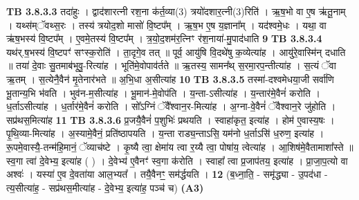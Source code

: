 \documentclass[17pt]{extarticle}
\begin{document}
{{{{{{{{{{{{{{{{{{{{{{                  \newline
                                \textbf{ TB 3.8.3.3} \newline
                  तदा॑हुः । द्वाद॑शारत्नी रश॒ना क॑र्त॒व्या(3) त्रयो॑दशार॒त्नी(3)रिति॑ । ऋ॒ष॒भो वा ए॒ष ऋ॑तू॒नाम् । यथ्स॑म्ॅवथ्स॒रः । तस्य॑ त्रयोद॒शो मासो॑ वि॒ष्टप᳚म् । ऋ॒ष॒भ ए॒ष य॒ज्ञाना᳚म् । यद॑श्वमे॒धः । यथा॒ वा ऋ॑ष॒भस्य॑ वि॒ष्टप᳚म् । ए॒वमे॒तस्य॑ वि॒ष्टप᳚म् । त्र॒यो॒द॒शम॑र॒त्निꣳ र॑श॒नाया॑-मु॒पाद॑धाति \textbf{ 9} \newline
                  \newline
                                \textbf{ TB 3.8.3.4} \newline
                  यथ॑र्.ष॒भस्य॑ वि॒ष्टपꣳ॑ सꣳस्क॒रोति॑ । ता॒दृगे॒व तत् ॥ पूर्व॒ आयु॑षि वि॒दथे॑षु क॒व्येत्या॑ह । आयु॑रे॒वास्मि॑न् दधाति ॥ तया॑ दे॒वाः सु॒तमाब॑भूवु॒-रित्या॑ह । भूति॑मे॒वोपाव॑र्तते ॥ ऋ॒तस्य॒ सामन᳚थ् स॒रमा॒रप॒न्तीत्या॑ह । स॒त्यं ॅवा ऋ॒तम् । स॒त्येनै॒वैन॑ मृ॒तेनार॑भते ॥ अ॒भि॒धा अ॒सीत्या॑ह \textbf{ 10} \newline
                  \newline
                                \textbf{ TB 3.8.3.5} \newline
                  तस्मा॑-दश्वमेधया॒जी सर्वा॑णि भू॒तान्य॒भि भ॑वति । भुव॑न-म॒सीत्या॑ह । भू॒मान॑-मे॒वोप॑ति । य॒न्ता-ऽसीत्या॑ह । य॒न्तार॑मे॒वैनं॑ करोति । ध॒र्ताऽसीत्या॑ह । ध॒र्तार॑मे॒वैनं॑ करोति । सो᳚ऽग्निं ॅवै᳚श्वान॒र-मित्या॑ह । अ॒ग्ना-वे॒वैनं॑ ॅवैश्वान॒रे जु॑होति । सप्र॑थस॒मित्या॑ह \textbf{ 11} \newline
                  \newline
                                \textbf{ TB 3.8.3.6} \newline
                  प्र॒जयै॒वैनं॑ प॒शुभिः॑ प्रथयति । स्वाहा॑कृत॒ इत्या॑ह । होम॑ ए॒वास्य॒षः । पृ॒थि॒व्या-मित्या॑ह । अ॒स्यामे॒वैनं॒ प्रति॑ष्ठापयति । य॒न्ता राड्य॒न्ताऽसि॒ यम॑नो ध॒र्ताऽसि॑ ध॒रुण॒ इत्या॑ह । रू॒पमे॒वास्यै॒-तन्म॑हि॒मानं॒ ॅव्याच॑ष्टे । कृ॒ष्यै त्वा॒ क्षेमा॑य त्वा र॒य्यै त्वा॒ पोषा॑य॒ त्वेत्या॑ह । आ॒शिष॑मे॒वैतामाशा᳚स्ते ॥स्व॒गा त्वा॑ दे॒वेभ्य॒ इत्या॑ह ( ) । दे॒वेभ्य॑ ए॒वैनꣳ॑ स्व॒गा क॑रोति । स्वाहा᳚ त्वा प्र॒जाप॑तय॒ इत्या॑ह । प्रा॒जा॒प॒त्यो वा अश्वः॑ । यस्या॑ ए॒व दे॒वता॑या आल॒भ्यत᳚ । तयै॒वैनꣳ॒॒ सम॑र्द्धयति । \textbf{ 12} \newline
                  \newline
                                    (ब॒ध्ना॒ति॒ - समृ॑द्ध्या - उ॒पद॑धा - त्य॒सीत्या॑ह॒ - सप्र॑थस॒मीत्या॑ह - दे॒वेभ्य॒ इत्या॑ह॒ पञ्च॑ च) \textbf{(A3)} \newline \newline
}}}}}}}}}}}}}}}}}}}}}}
\end{document}
